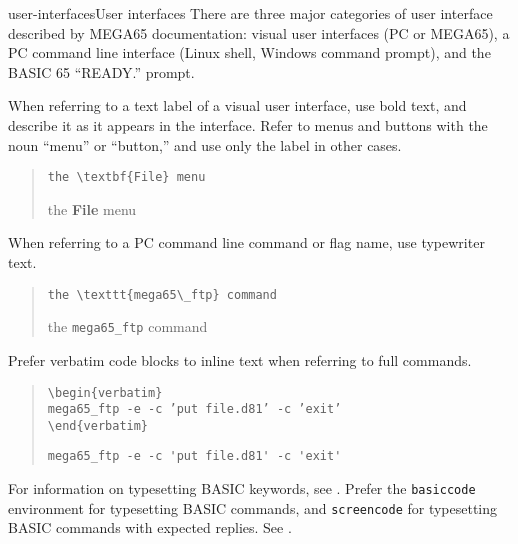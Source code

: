 \begin{sgentry}{user-interfaces}{User interfaces}
    There are three major categories of user interface described by MEGA65 documentation: visual user interfaces (PC or MEGA65), a PC command line interface (Linux shell, Windows command prompt), and the BASIC 65 ``READY.'' prompt.

    When referring to a text label of a visual user interface, use bold text, and describe it as it appears in the interface. Refer to menus and buttons with the noun ``menu'' or ``button,'' and use only the label in other cases.

    \begin{quote}
        \texttt{the {\textbackslash}textbf\{File\} menu}

        \hrulefill

        the \textbf{File} menu
    \end{quote}

    When referring to a PC command line command or flag name, use typewriter text.

    \begin{quote}
        \texttt{the {\textbackslash}texttt\{mega65{\textbackslash}\_ftp\} command}

        \hrulefill

        the \texttt{mega65\_ftp} command
    \end{quote}

    Prefer verbatim code blocks to inline text when referring to full commands.

    \begin{quote}
        \texttt{{\textbackslash}begin\{verbatim\} \\
        mega65\_ftp -e -c 'put file.d81' -c 'exit' \\
        {\textbackslash}end\{verbatim\}}

        \hrulefill

\begin{verbatim}
mega65_ftp -e -c 'put file.d81' -c 'exit'
\end{verbatim}
    \end{quote}

    For information on typesetting BASIC keywords, see . Prefer the \texttt{basiccode} environment for typesetting BASIC commands, and \texttt{screencode} for typesetting BASIC commands with expected replies. See .
\end{sgentry}



